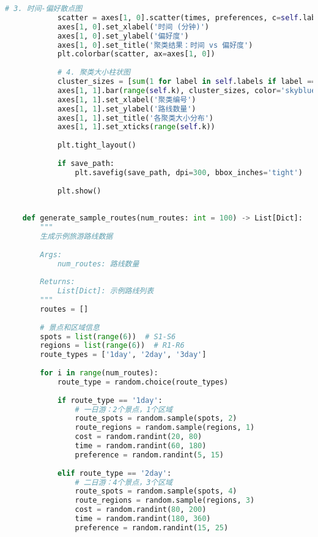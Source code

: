 \begin{lstlisting}[language=Python]
            # 3. 时间-偏好散点图
            scatter = axes[1, 0].scatter(times, preferences, c=self.labels, cmap='viridis', alpha=0.7)
            axes[1, 0].set_xlabel('时间 (分钟)')
            axes[1, 0].set_ylabel('偏好度')
            axes[1, 0].set_title('聚类结果：时间 vs 偏好度')
            plt.colorbar(scatter, ax=axes[1, 0])
            
            # 4. 聚类大小柱状图
            cluster_sizes = [sum(1 for label in self.labels if label == i) for i in range(self.k)]
            axes[1, 1].bar(range(self.k), cluster_sizes, color='skyblue', alpha=0.7)
            axes[1, 1].set_xlabel('聚类编号')
            axes[1, 1].set_ylabel('路线数量')
            axes[1, 1].set_title('各聚类大小分布')
            axes[1, 1].set_xticks(range(self.k))
            
            plt.tight_layout()
            
            if save_path:
                plt.savefig(save_path, dpi=300, bbox_inches='tight')
            
            plt.show()
    
    
    def generate_sample_routes(num_routes: int = 100) -> List[Dict]:
        """
        生成示例旅游路线数据
        
        Args:
            num_routes: 路线数量
            
        Returns:
            List[Dict]: 示例路线列表
        """
        routes = []
        
        # 景点和区域信息
        spots = list(range(6))  # S1-S6
        regions = list(range(6))  # R1-R6
        route_types = ['1day', '2day', '3day']
        
        for i in range(num_routes):
            route_type = random.choice(route_types)
            
            if route_type == '1day':
                # 一日游：2个景点，1个区域
                route_spots = random.sample(spots, 2)
                route_regions = random.sample(regions, 1)
                cost = random.randint(20, 80)
                time = random.randint(60, 180)
                preference = random.randint(5, 15)
                
            elif route_type == '2day':
                # 二日游：4个景点，3个区域
                route_spots = random.sample(spots, 4)
                route_regions = random.sample(regions, 3)
                cost = random.randint(80, 200)
                time = random.randint(180, 360)
                preference = random.randint(15, 25)
                

\end{lstlisting}

